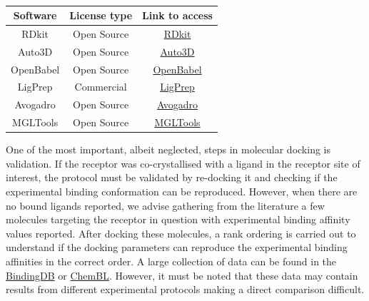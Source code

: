 \begin{table}[ht]
    \centering
    \caption{{\color{red}{List of Tools for Ligand preparation and format conversion}}}
    \label{tab:list2}
    \begin{tabular}{|c|c|c|}
    \hline
         \textbf{Software} & \textbf{License type} & \textbf{Link to access} \\
    \hline
        RDkit & Open Source & \href{https://github.com/rdkit/rdkit}{RDkit} \\
        Auto3D & Open Source & \href{https://github.com/isayevlab/Auto3D_pkg}{Auto3D}  \\
        OpenBabel & Open Source & \href{https://github.com/openbabel/openbabel}{OpenBabel}  \\
        LigPrep & Commercial & \href{https://www.schrodinger.com/platform/products/ligprep/}{LigPrep} \\
        Avogadro & Open Source & \href{https://avogadro.cc/}{Avogadro}  \\
        MGLTools & Open Source & \href{https://ccsb.scripps.edu/mgltools/downloads/}{MGLTools} \\
    \hline
    \end{tabular}
\end{table}

One of the most important, albeit neglected, steps in molecular docking is validation. If the receptor was co-crystallised with a ligand in the receptor site of interest, the protocol must be validated by re-docking it and checking if the experimental binding conformation can be reproduced. However, when there are no bound ligands reported, we advise gathering from the literature a few molecules targeting the receptor in question with experimental binding affinity values reported. After docking these molecules, a rank ordering is carried out to understand if the docking parameters can reproduce the experimental binding affinities in the correct order. {} A large collection of data can be found in the \href{https://www.bindingdb.org/rwd/bind/index.jsp}{BindingDB} or  \href{https://www.ebi.ac.uk/chembl/}{ChemBL}. However, it must be noted that these data may contain results from different experimental protocols making a direct comparison difficult.

